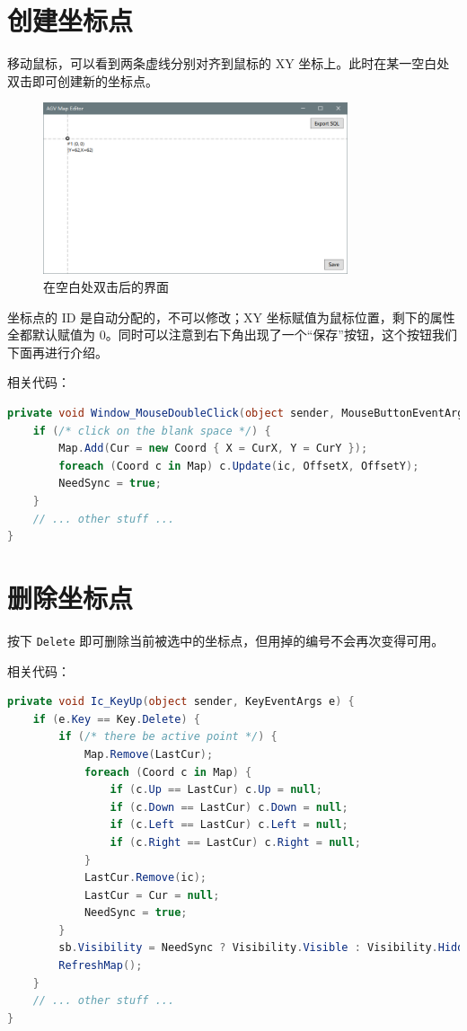 \section{创建坐标点}

移动鼠标，可以看到两条虚线分别对齐到鼠标的 XY 坐标上。此时在某一空白处双击即可创建新的坐标点。

\begin{figure}[H]
  \centering
  \includegraphics[width=0.8\textwidth]{assets/dbclick.png}
  \caption{在空白处双击后的界面}
  \label{fig:dbclick}
\end{figure}

坐标点的 ID 是自动分配的，不可以修改；XY 坐标赋值为鼠标位置，剩下的属性全都默认赋值为 0。同时可以注意到右下角出现了一个``保存''按钮，这个按钮我们下面再进行介绍。

相关代码：

\begin{lstlisting}[language=cs]
private void Window_MouseDoubleClick(object sender, MouseButtonEventArgs e) {
    if (/* click on the blank space */) {
        Map.Add(Cur = new Coord { X = CurX, Y = CurY });
        foreach (Coord c in Map) c.Update(ic, OffsetX, OffsetY);
        NeedSync = true;
    }
    // ... other stuff ...
}
\end{lstlisting}

\section{删除坐标点}

按下 \texttt{Delete} 即可删除当前被选中的坐标点，但用掉的编号不会再次变得可用。

相关代码：

\begin{lstlisting}[language=cs]
private void Ic_KeyUp(object sender, KeyEventArgs e) {
    if (e.Key == Key.Delete) {
        if (/* there be active point */) {
            Map.Remove(LastCur);
            foreach (Coord c in Map) {
                if (c.Up == LastCur) c.Up = null;
                if (c.Down == LastCur) c.Down = null;
                if (c.Left == LastCur) c.Left = null;
                if (c.Right == LastCur) c.Right = null;
            }
            LastCur.Remove(ic);
            LastCur = Cur = null;
            NeedSync = true;
        }
        sb.Visibility = NeedSync ? Visibility.Visible : Visibility.Hidden;
        RefreshMap();
    }
    // ... other stuff ...
}
\end{lstlisting}

